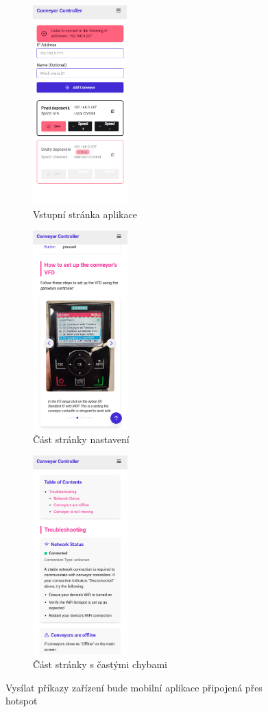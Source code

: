 \begin{figure}[hptb]
	\centering
	\begin{subfigure}[t]{0.3\textwidth}
		\includegraphics[width=\textwidth, height=290px]{images/MobilniLanding.png}
		\caption{Vstupní stránka aplikace}
		\label{fig:MobilniLanding}
	\end{subfigure}%
	\begin{subfigure}[t]{0.3\textwidth}
		\includegraphics[width=\textwidth, height=290px]{images/MobilniSetup.png}
		\caption{Část stránky nastavení}
		\label{fig:MobilniSetup}
	\end{subfigure}%
	\begin{subfigure}[t]{0.3\textwidth}
		\includegraphics[width=\textwidth, height=290px]{images/MobilniHelp.png}
		\caption{Část stránky s častými chybami}
		\label{fig:MobilniHelp}
	\end{subfigure}
	\caption{Vysílat příkazy zařízení bude mobilní aplikace připojená přes hotspot}
	\label{fig:MobilniAppScreenshots}
\end{figure}

